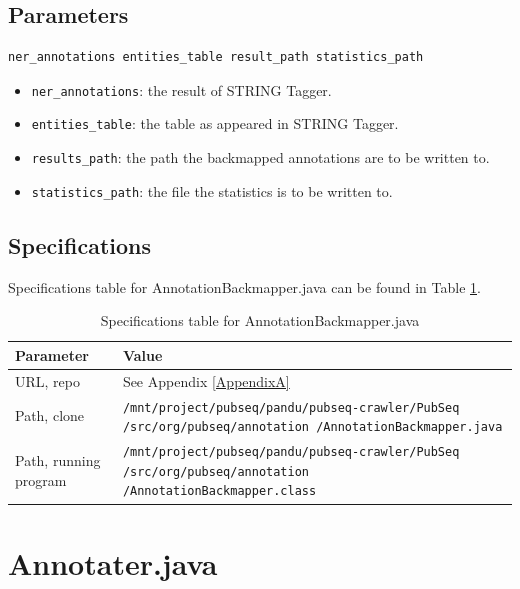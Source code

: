 \subsection{Parameters}

\begin{lstlisting}[breaklines]
ner_annotations entities_table result_path statistics_path
\end{lstlisting}

\begin{itemize}
\item \texttt{ner\_annotations}: the result of STRING Tagger.
\item \texttt{entities\_table}: the table as appeared in STRING Tagger.
\item \texttt{results\_path}: the path the backmapped annotations are to be written to.
\item \texttt{statistics\_path}: the file the statistics is to be written to.
\end{itemize}

\subsection{Specifications}

Specifications table for AnnotationBackmapper.java can be found in Table \ref{tab:AnnotationBackmapper}.

\begin{table}[htbp]
\caption{Specifications table for AnnotationBackmapper.java}
\centering
\begin{tabularx}{\textwidth}{ | l | X | }
  \hline
  Parameter & Value \\
  \hline
  URL, repo & See Appendix \ref{AppendixA} \\
  Path, clone & \texttt{/mnt/project/pubseq/pandu/pubseq-crawler/PubSeq /src/org/pubseq/annotation /AnnotationBackmapper.java} \\
  Path, running program & \texttt{/mnt/project/pubseq/pandu/pubseq-crawler/PubSeq /src/org/pubseq/annotation /AnnotationBackmapper.class}\\
  \hline
\end{tabularx}
\label{tab:AnnotationBackmapper}
\end{table}


\section{Annotater.java}

